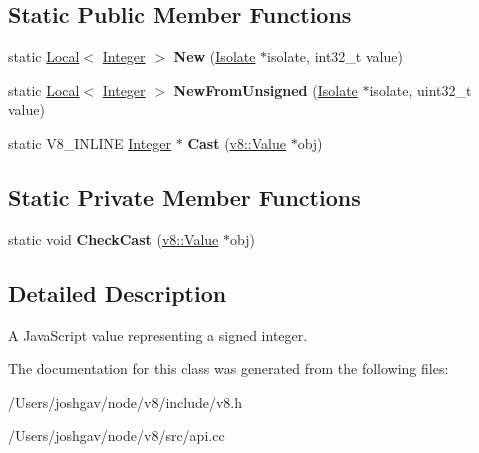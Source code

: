 \subsection*{Static Public Member Functions}
\begin{DoxyCompactItemize}
\item 
static \hyperlink{classv8_1_1_local}{Local}$<$ \hyperlink{classv8_1_1_integer}{Integer} $>$ {\bfseries New} (\hyperlink{classv8_1_1_isolate}{Isolate} $\ast$isolate, int32\+\_\+t value)\hypertarget{classv8_1_1_integer_acd94a64ebeb75a97c42a20c15738fca4}{}\label{classv8_1_1_integer_acd94a64ebeb75a97c42a20c15738fca4}

\item 
static \hyperlink{classv8_1_1_local}{Local}$<$ \hyperlink{classv8_1_1_integer}{Integer} $>$ {\bfseries New\+From\+Unsigned} (\hyperlink{classv8_1_1_isolate}{Isolate} $\ast$isolate, uint32\+\_\+t value)\hypertarget{classv8_1_1_integer_af5543ee5baef2567151d698b06d2087d}{}\label{classv8_1_1_integer_af5543ee5baef2567151d698b06d2087d}

\item 
static V8\+\_\+\+I\+N\+L\+I\+NE \hyperlink{classv8_1_1_integer}{Integer} $\ast$ {\bfseries Cast} (\hyperlink{classv8_1_1_value}{v8\+::\+Value} $\ast$obj)\hypertarget{classv8_1_1_integer_a886f73d3d8bb91f8235f66d8dccec12a}{}\label{classv8_1_1_integer_a886f73d3d8bb91f8235f66d8dccec12a}

\end{DoxyCompactItemize}
\subsection*{Static Private Member Functions}
\begin{DoxyCompactItemize}
\item 
static void {\bfseries Check\+Cast} (\hyperlink{classv8_1_1_value}{v8\+::\+Value} $\ast$obj)\hypertarget{classv8_1_1_integer_acf091e2310caefdeecd51ffa1157ba2c}{}\label{classv8_1_1_integer_acf091e2310caefdeecd51ffa1157ba2c}

\end{DoxyCompactItemize}


\subsection{Detailed Description}
A Java\+Script value representing a signed integer. 

The documentation for this class was generated from the following files\+:\begin{DoxyCompactItemize}
\item 
/\+Users/joshgav/node/v8/include/v8.\+h\item 
/\+Users/joshgav/node/v8/src/api.\+cc\end{DoxyCompactItemize}
